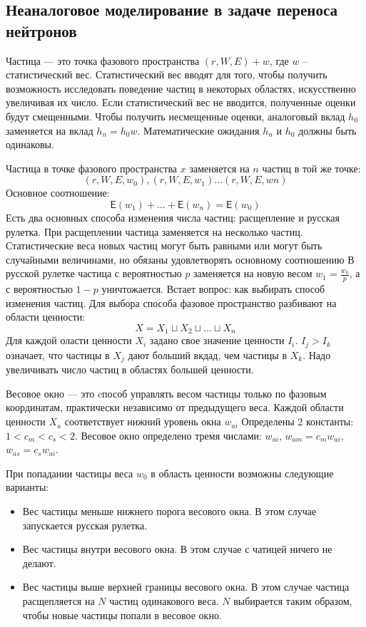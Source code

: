 \documentclass[pdftex,ptm,12pt,a4paper]{report}
\begin{document}
  \subsection{Неаналоговое моделирование в задаче переноса нейтронов}
    Частица --- это точка фазового пространства $(r,W,E)+w$, где $w$ – статистический вес.
    Статистический вес вводят для того, чтобы получить возможность исследовать поведение частиц в некоторых областях, искусственно увеличивая их число.
    Если статистический вес не вводится, полученные оценки будут смещенными.
    Чтобы получить несмещенные оценки,
    аналоговый вклад $h_0$ заменяется на вклад $h_n=h_0 w$.
    Математические ожидания $h_n$ и $h_0$ должны быть одинаковы.

    Частица в точке фазового пространства $x$ заменяется на $n$ частиц в той же точке:
    \[
      (r,W,E,w_0), (r,W,E,w_1) \dots (r,W,E,wn)
    \]
    Основное соотношение:
    \[
      \mathsf{E}(w_1) + \dots + \mathsf{E}(w_n) = \mathsf{E}(w_0)
    \]
    Есть два основных способа изменения числа частиц: расщепление и русская рулетка.
    При расщеплении частица заменяется на несколько частиц.
    Статистические веса новых частиц могут быть равными или могут быть случайными величинами, но обязаны удовлетворять основному соотношению
    В русской рулетке частица с вероятностью $p$ заменяется на новую весом $w_1 = \frac{w_0}{p}$, а с вероятностью $1-p$ уничтожается.
    Встает вопрос: как выбирать способ изменения частиц.
    Для выбора способа фазовое пространство разбивают на области ценности:
    \[
      X = X_1 \sqcup X_2 \sqcup \dots \sqcup X_n
    \]
    Для каждой оласти ценности $X_i$ задано свое значение ценности $I_i$.
    $I_j> I_k$ означает, что частицы в $X_j$ дают больший вкдад, чем частицы в $X_k$.
    Надо увеличивать число частиц в областях большей ценности.

    Весовое окно --- это cпособ управлять весом частицы только по фазовым координатам, практически независимо от предыдущего веса.
    Каждой области ценности $X_a$ соответствует нижний уровень окна $w_{ai}$
    Определены 2 константы: $1 < c_m < c_s  < 2$.
    Весовое окно определено тремя числами:
    $w_{ai}$, $w_{am}=c_m w_{ai}$, $w_{as}=c_s w_{ai}$.

    При попадании частицы веса $w_0$ в область ценности возможны следующие варианты:
    \begin{itemize}
      \item
        Вес частицы меньше нижнего порога весового окна.
        В этом случае запускается русская рулетка.
      \item
        Вес частицы внутри весового окна.
        В этом случае с чатицей ничего не делают.
      \item
        Вес частицы выше верхней границы весового окна.
        В этом случае частица расщепляется на $N$ частиц одинакового веса.
        $N$ выбирается таким образом, чтобы новые частицы попали в весовое окно.
    \end{itemize}
\end{document}
